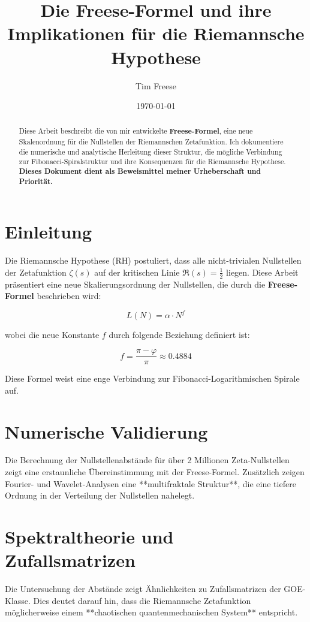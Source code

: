 \documentclass[a4paper,12pt]{article}
\title{Die Freese-Formel und ihre Implikationen für die Riemannsche Hypothese}
\author{Tim Freese}
\date{\today}
\begin{document}
\maketitle

\begin{abstract}
Diese Arbeit beschreibt die von mir entwickelte \textbf{Freese-Formel}, eine neue Skalenordnung für die Nullstellen der Riemannschen Zetafunktion.  
Ich dokumentiere die numerische und analytische Herleitung dieser Struktur, die mögliche Verbindung zur Fibonacci-Spiralstruktur und ihre Konsequenzen für die Riemannsche Hypothese.  
\textbf{Dieses Dokument dient als Beweismittel meiner Urheberschaft und Priorität.}
\end{abstract}

\section{Einleitung}
Die Riemannsche Hypothese (RH) postuliert, dass alle nicht-trivialen Nullstellen der Zetafunktion $\zeta(s)$ auf der kritischen Linie \( \Re(s) = \frac{1}{2} \) liegen.  
Diese Arbeit präsentiert eine neue Skalierungsordnung der Nullstellen, die durch die \textbf{Freese-Formel} beschrieben wird:

\[
L(N) = \alpha \cdot N^f
\]

wobei die neue Konstante \( f \) durch folgende Beziehung definiert ist:

\[
f = \frac{\pi - \varphi}{\pi} \approx 0.4884
\]

Diese Formel weist eine enge Verbindung zur Fibonacci-Logarithmischen Spirale auf.

\section{Numerische Validierung}
Die Berechnung der Nullstellenabstände für über 2 Millionen Zeta-Nullstellen zeigt eine erstaunliche Übereinstimmung mit der Freese-Formel.  
Zusätzlich zeigen Fourier- und Wavelet-Analysen eine **multifraktale Struktur**, die eine tiefere Ordnung in der Verteilung der Nullstellen nahelegt.

\section{Spektraltheorie und Zufallsmatrizen}
Die Untersuchung der Abstände zeigt Ähnlichkeiten zu Zufallsmatrizen der GOE-Klasse.  
Dies deutet darauf hin, dass die Riemannsche Zetafunktion möglicherweise einem **chaotischen quantenmechanischen System** entspricht.
\end{document}
